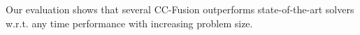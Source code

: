 \documentclass[10pt,twocolumn,letterpaper]{article}
\theoremstyle{definition}
\begin{document}
Our evaluation shows that several CC-Fusion
outperforms state-of-the-art solvers w.r.t. any time performance 
with increasing problem size.


    


\newpage

\FloatBarrier
{\small


}



% 
% 
% 
% 
% 
% 
% 
\end{document}
